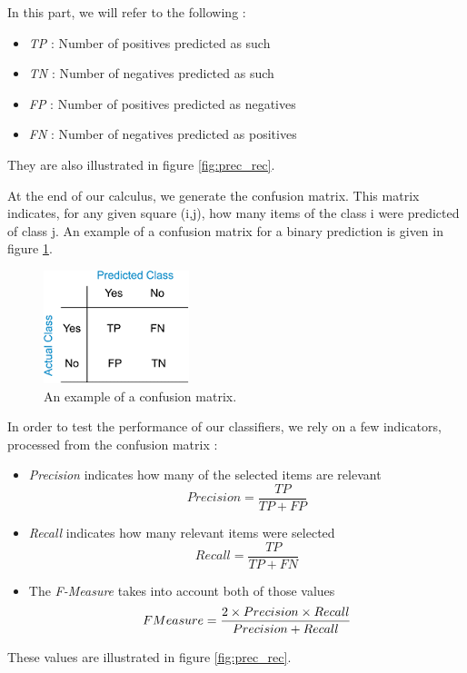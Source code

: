 In this part, we will refer to the following : 
\begin{itemize}
	\item \emph{TP} : Number of positives predicted as such
	\item \emph{TN} : Number of negatives predicted as such
	\item \emph{FP} : Number of positives predicted as negatives
	\item \emph{FN} : Number of negatives predicted as positives
\end{itemize}
They are also illustrated in figure \ref{fig:prec_rec}.

At the end of our calculus, we generate the confusion matrix.
This matrix indicates, for any given square (i,j), how many items of the class i were predicted of class j.
An example of a confusion matrix for a binary prediction is given in figure \ref{fig:confusion}.

\begin{figure}[!h]
\centering
\includegraphics[width=.3\textwidth]{Images/confusion.png}
\caption{An example of a confusion matrix.}
\label{fig:confusion}
\end{figure}


In order to test the performance of our classifiers, we rely on a few indicators, processed from the confusion matrix :
\begin{itemize}
	\item \emph{Precision} indicates how many of the selected items are relevant
		\begin{equation*}
		Precision = \frac{TP}{TP+FP}
		\end{equation*}
	\item \emph{Recall} indicates how many relevant items were selected 
		\begin{equation*}
		Recall = \frac{TP}{TP+FN}
		\end{equation*}
	\item The \emph{F-Measure} takes into account both of those values
		\begin{equation*}
		F\-Measure = \frac{2\times Precision\times Recall}{Precision + Recall}
		\end{equation*}
\end{itemize}
These values are illustrated in figure \ref{fig:prec_rec}.

